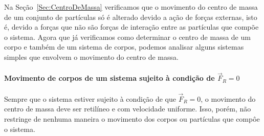 Na Seção~\ref{Sec:CentroDeMassa} verificamos que o movimento do centro de massa de um conjunto de partículas só é alterado devido a ação de forças externas, isto é, devido a forças que não são forças de interação entre as partículas que compõe o sistema. Agora que já verificamos como determinar o centro de massa de um corpo e também de um sistema de corpos, podemos analisar alguns sistemas simples que envolvem o movimento do centro de massa.

\paragraph{Movimento de corpos de um sistema sujeito à condição de $\vec{F}_R = 0$}

Sempre que o sistema estiver sujeito à condição de que $\vec{F}_R = 0$, o movimento do centro de massa deve ser retilíneo e com velocidade uniforme. Isso, porém, não restringe de nenhuma maneira o movimento dos corpos ou partículas que compôe o sistema.

